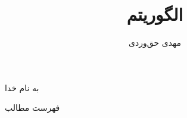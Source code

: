 \documentclass[aspectratio=169, dvipsnames, svgnames, x11names]{beamer}
\title{الگوریتم \lr{Timsort}}
\author{
مهدی حق‌وردی
}
\institute{
\\
\texttt{[image: logos/ui.png]}}
\date{}
\begin{document}
\begin{frame}[plain]
\begin{center}
به نام خدا
\end{center}

\maketitle

\end{frame}

\setcounter{framenumber}{0}
\raggedleft

\begin{frame}{فهرست مطالب}
\begin{flushright}
\tableofcontents
\end{flushright}
\end{frame}









\end{document}
